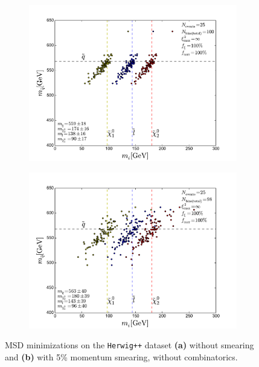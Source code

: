 \documentclass[twoside,english]{uiofysmaster}
\begin{document}
\begin{figure}[hbt]
	\centering
	\begin{subfigure}[b]{0.45\textwidth}
		\includegraphics[width=\textwidth]{figures/improving_combinatorics/herwigpp-MD-dileptonedge-fit-nocomb-nosmear-nocut.pdf} 
		\caption{ }
		\label{fig:MD_nocomb-nosmear}
	\end{subfigure}
	\begin{subfigure}[b]{0.45\textwidth}
		\includegraphics[width=\textwidth]{figures/improving_combinatorics/herwigpp-MD-dileptonedge-fit-nocomb-5psmear-nocut.pdf} 
		\caption{ }
		\label{fig:MD_nocomb-5psmear}
	\end{subfigure}
	\caption{MSD minimizations on the {\tt Herwig++} dataset {\bf (a)} without smearing and {\bf (b)} with 5\% momentum smearing, without combinatorics.}
\end{figure}
\end{document}
